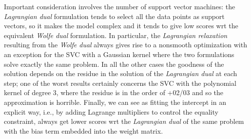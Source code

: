 Important consideration involves the number of support vector machines: the \emph{Lagrangian dual} formulation tends to select all the data points as support vectors, so it makes the model complex and it tends to give low scores wrt the equivalent \emph{Wolfe dual} formulation. In particular, the \emph{Lagrangian relaxation} resulting from the \emph{Wolfe dual} always gives rise to a nonsmooth optimization with an exception for the SVC with a Gaussian kernel where the two formulations solve exactly the same problem. In all the other cases the goodness of the solution depends on the residue in the solution of the \emph{Lagrangian dual} at each step; one of the worst results certainly concerns the SVC with the polynomial kernel of degree 3, where the residue is in the order of +02/03 and so the approximation is horrible. Finally, we can see as fitting the intercept in an explicit way, i.e., by adding Lagrange multipliers to control the equality constraint, always get lower scores wrt the \emph{Lagrangian dual} of the same problem with the bias term embedded into the weight matrix.